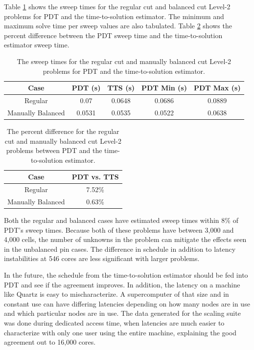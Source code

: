 \documentclass[times,final]{elsarticle}
\begin{document}
Table \ref{level2_sweep_times} shows the sweep times for the regular cut and balanced cut Level-2 problems for PDT and the time-to-solution estimator. The minimum and maximum solve time per sweep values are also tabulated.
Table \ref{level2_percent_diff} shows the percent difference between the PDT sweep time and the time-to-solution estimator sweep time.
\begin{table}[ht]
\centering
\caption{The sweep times for the regular cut and manually balanced cut Level-2 problems for PDT and the time-to-solution estimator.}
\label{level2_sweep_times}
\begin{tabular}{c|c|c|c|c}
\bf Case & \bf PDT (s) & \bf TTS (s) & \bf PDT Min (s) & \bf PDT Max (s) \\ \hline
Regular & 0.07 & 0.0648 & 0.0686 & 0.0889\\ \hline
Manually Balanced & 0.0531 & 0.0535 & 0.0522 & 0.0638
\end{tabular}
\end{table}
\begin{table}[ht]
\centering
\caption{The percent difference for the regular cut and manually balanced cut Level-2 problems between PDT and the time-to-solution estimator.}
\label{level2_percent_diff}
\begin{tabular}{c|c}
\textbf{Case} & \bf PDT vs. TTS \\ \hline
Regular & 7.52\% \\ \hline
Manually Balanced & 0.63\%
\end{tabular}
\end{table}
Both the regular and balanced cases have estimated sweep times within 8\% of PDT's sweep times.
Because both of these problems have between 3,000 and 4,000 cells, the number of unknowns in the problem can mitigate the effects seen in the unbalanced pin cases.
The difference in schedule in addition to latency instabilities at 546 cores are less significant with larger problems.

In the future, the schedule from the time-to-solution estimator should be fed into PDT and see if the agreement improves.
In addition, the latency on a machine like Quartz is easy to mischaracterize.
A supercomputer of that size and in constant use can have differing latencies depending on how many nodes are in use and which particular nodes are in use.
The data generated for the scaling suite was done during dedicated access time, when latencies are much easier to characterize with only one user using the entire machine, explaining the good agreement out to 16,000 cores.
\end{document}
